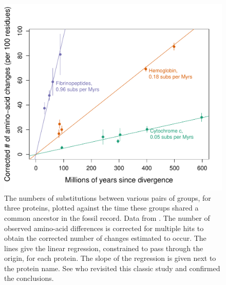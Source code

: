 \begin{figure}
\begin{center}
\includegraphics[width=0.8 \textwidth]{Journal_figs/genetic_drift/Molecular_clock_Dickerson/Dickerson_1979_mole_clock_fig.pdf}
\end{center}
\caption{The numbers of substitutions between various pairs of groups, for three proteins, plotted against the time these groups shared a common ancestor in the fossil record. Data from  \citet{dickerson1971structure}. The number of observed amino-acid differences is corrected for multiple hits to obtain the corrected number of changes estimated to occur. The lines give the linear regression, constrained to pass through the origin, for each protein. The slope of the regression is given next to the protein name.  See \citep{robinson2016revisiting} who revisited this classic study and confirmed the conclusions.} \label{fig:Dickerson_mole_clock}  
\end{figure}

